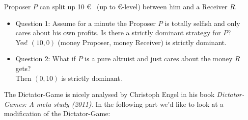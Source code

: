 \begin{example} 
Proposer $P$ can split up 10 \euro ~ (up to \euro-level) between him and a Receiver $R$. 
	\begin{itemize}
		\item Question 1: Assume for a minute the Proposer $P$ is totally selfish and only cares about his own profits. Is there a strictly dominant strategy for $P$? \\
			Yes! $(10, 0)$ (money Proposer, money Receiver) is strictly dominant.
		\item Question 2: What if $P$ is a pure altruist and just cares about the money $R$ gets? \\
			Then $(0, 10)$ is strictly dominant.
	\end{itemize}
\end{example}


The Dictator-Game is nicely analysed by Christoph Engel in his book \textit{Dictator-Games: A meta study (2011)}. In the following part we'd like to look at a modification of the Dictator-Game:

